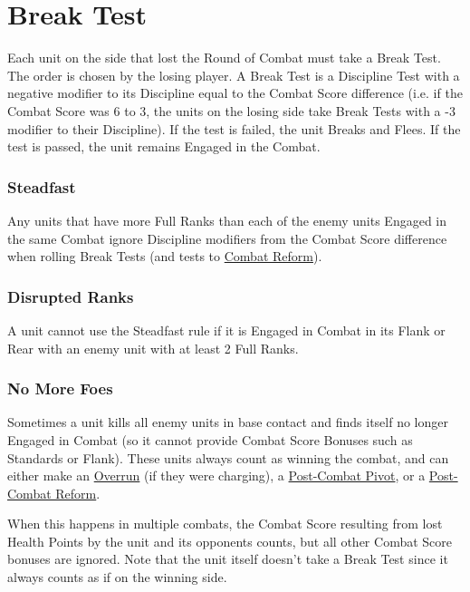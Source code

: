 \section{Break Test}
\label{break_test}

Each unit on the side that lost the Round of Combat must take a Break Test. The order is chosen by the losing player. A Break Test is a Discipline Test with a negative modifier to its Discipline equal to the Combat Score difference (i.e. if the Combat Score was 6 to 3, the units on the losing side take Break Tests with a -3 modifier to their Discipline). If the test is failed, the unit Breaks and Flees. If the test is passed, the unit remains Engaged in the Combat.

\subsubsection{Steadfast}
\label{steadfast}

Any units that have more Full Ranks than each of the enemy units Engaged in the same Combat ignore Discipline modifiers from the Combat Score difference when rolling Break Tests (and tests to \hyperref[combat_reform]{Combat Reform}). 

\subsubsection{Disrupted Ranks}
\label{disrupted_ranks}

A unit cannot use the Steadfast rule if it is Engaged in Combat in its Flank or Rear with an enemy unit with at least 2 Full Ranks.

\subsubsection{No More Foes}
\label{no_more_foes}

Sometimes a unit kills all enemy units in base contact and finds itself no longer Engaged in Combat (so it cannot provide Combat Score Bonuses such as Standards or Flank). These units always count as winning the combat, and can either make an \hyperref[overrun]{Overrun} (if they were charging), a \hyperref[post_combat_pivot]{Post-Combat Pivot}, or a \hyperref[post_combat_reform]{Post-Combat Reform}.

When this happens in multiple combats, the Combat Score resulting from lost Health Points by the unit and its opponents counts, but all other Combat Score bonuses are ignored. Note that the unit itself doesn't take a Break Test since it always counts as if on the winning side.

